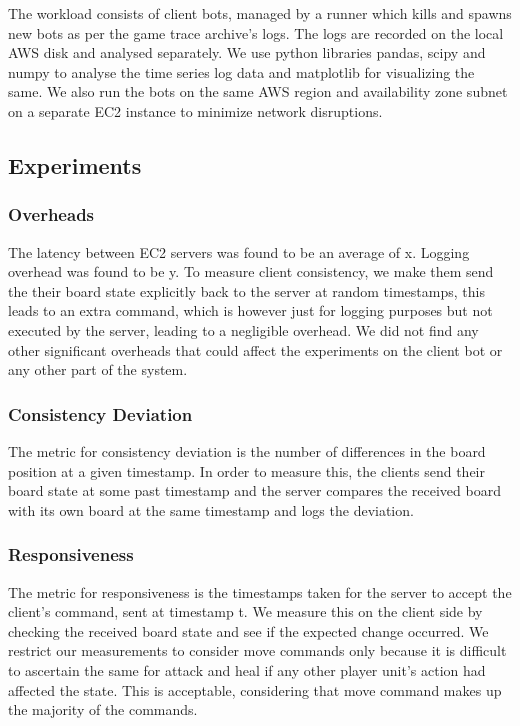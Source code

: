 \documentclass[a4paper]{IEEEtran}
\begin{document}
  The workload consists of client bots, managed by a runner which kills and spawns new bots as per the game trace archive's logs. The logs are recorded on the local AWS disk and analysed separately.
  We use python libraries pandas, scipy and numpy to analyse the time series log data and matplotlib for visualizing the same. We also run the bots on the same AWS region and availability zone subnet on a separate EC2 instance to minimize network disruptions.
  
  \subsection{Experiments}
  
  \subsubsection{Overheads}

  The latency between EC2 servers was found to be an average of x. Logging overhead was found to be y. To measure client consistency, we make them send the their board state explicitly back to the server at random timestamps, this leads to an extra command, which is however just for logging purposes but not executed by the server, leading to a negligible overhead. We did not find any other significant overheads that could affect the experiments on the client bot or any other part of the system.
  
  \subsubsection{Consistency Deviation}

  The metric for consistency deviation is the number of differences in the board position at a given timestamp. In order to measure this, the clients send their board state at some past timestamp and the server compares the received board with its own board at the same timestamp and logs the deviation.
  
  \subsubsection{Responsiveness}

  The metric for responsiveness is the timestamps taken for the server to accept the client's command, sent at timestamp t. We measure this on the client side by checking the received board state and see if the expected change occurred. We restrict our measurements to consider move commands only because it is difficult to ascertain the same for attack and heal if any other player unit's action had affected the state. This is acceptable, considering that move command makes up the majority of the commands. 
  
\end{document}

